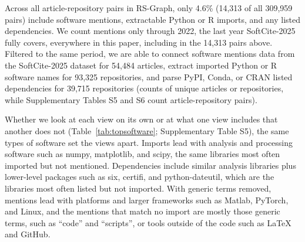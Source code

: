 \documentclass[pdflatex,sn-nature]{sn-jnl}%
\begin{document}
Across all article-repository pairs in RS-Graph, only 4.6\% (14,313 of all 309,959 pairs) include software mentions, extractable Python or R imports, and any listed dependencies. We count mentions only through 2022, the last year SoftCite-2025 fully covers, everywhere in this paper, including in the 14,313 pairs above. Filtered to the same period, we are able to connect software mentions data from the SoftCite-2025 dataset for 54,484 articles, extract imported Python or R software names for 93,325 repositories, and parse PyPI, Conda, or CRAN listed dependencies for 39,715 repositories (counts of unique articles or repositories, while Supplementary Tables S5 and S6 count article-repository pairs).

Whether we look at each view on its own or at what one view includes that another does not (Table~\ref{tab:topsoftware}; Supplementary Table S5), the same types of software set the views apart. Imports lead with analysis and processing software such as numpy, matplotlib, and scipy, the same libraries most often imported but not mentioned. Dependencies include similar analysis libraries plus lower-level packages such as six, certifi, and python-dateutil, which are the libraries most often listed but not imported. With generic terms removed, mentions lead with platforms and larger frameworks such as Matlab, PyTorch, and Linux, and the mentions that match no import are mostly those generic terms, such as ``code'' and ``scripts'', or tools outside of the code such as LaTeX and GitHub.
\end{document}

